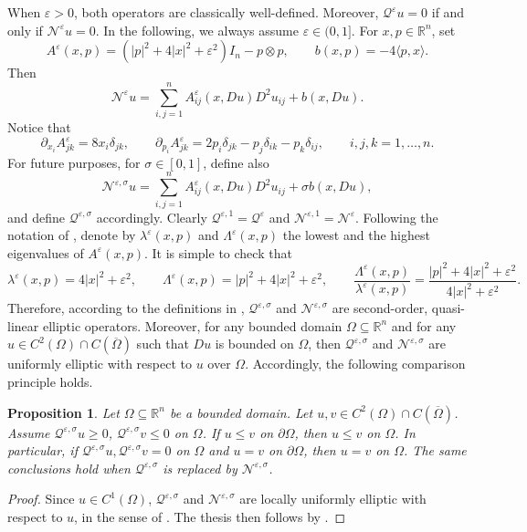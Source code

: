\documentclass[11pt]{amsart}
\renewcommand{\leq}{\leqslant}
\renewcommand{\geq}{\geqslant}
\renewcommand{\ge}{>}
\newcommand{\rr}{{\mathbb{R}}}
\newcommand{\Om}{\Omega}
\newcommand{\eps}{\varepsilon}
\newcommand{\Qe}{\mathcal Q^\eps}
\newcommand{\Ne}{\mathcal N^\eps}
\newcommand{\Nes}{\mathcal N^{\eps,\sigma}}
\newcommand{\Qes}{\mathcal Q^{\eps,\sigma}}
\newcommand{\Ae}{A^\eps}
\newtheorem{proposition}[theorem]{Proposition}
\theoremstyle{definition}
\theoremstyle{remark}
\numberwithin{equation}{section}
\begin{document}
When $\eps\ge 0$, both operators are classically well-defined. Moreover, $\Qe u=0$ if and only if $\Ne u=0$. In the following, we always assume $\eps\in(0,1]$. For $x,p\in\rr^n$, set 
\begin{equation}\label{definizione_matrici_eqregeps}
    \Ae(x,p)=(|p|^2+4|x|^2+\eps^2)I_n-p\otimes p,\qquad b(x,p)=-4\langle p,x\rangle.
\end{equation}
Then 
\begin{equation*}
    \Ne u=\sum_{i,j=1}^n\Ae_{ij}(x,Du)D^2 u_{ij}+b(x,Du).
    \end{equation*}
    Notice that 
    \begin{equation}\label{derivatematriceae384869}
        \partial _{x_i}\Ae_{jk}=8x_i\delta_{jk},\qquad  \partial _{p_i}\Ae_{jk}=2p_i\delta_{jk}-p_j\delta_{ik}-p_k\delta_{ij},\qquad i,j,k=1,\ldots,n.
    \end{equation}
    For future purposes, for $\sigma\in[0,1]$, define also 
  \begin{equation*}
    \Nes u=\sum_{i,j=1}^n\Ae_{ij}(x,Du)D^2 u_{ij}+\sigma b(x,Du),
    \end{equation*}
    and define $\Qes$ accordingly. Clearly $\mathcal Q^{\eps,1}=\Qe$ and $\mathcal N^{\eps,1}=\Ne$.
Following the notation of \cite{MR1814364}, denote by $\lambda^\eps(x,p)$ and $\Lambda^\eps(x,p)$ the lowest and the highest eigenvalues of $\Ae(x,p)$. It is simple to check that 
\begin{equation}\label{eigenvaluesofaeps}
    \lambda^\eps(x,p)=4|x|^2+\eps^2,\qquad \Lambda^\eps(x,p)=|p|^2+4|x|^2+\eps^2,\qquad\frac{\Lambda^\eps(x,p)}{\lambda^\eps(x,p)}=\frac{|p|^2+4|x|^2+\eps^2}{4|x|^2+\eps^2}.
\end{equation}
Therefore, according to the definitions in \cite[Chapter 10]{MR1814364}, $\Qes$ and $\Nes$ are second-order, quasi-linear elliptic operators. Moreover, for any bounded domain $\Om\subseteq\rr^n$ and for any $u\in C^2(\Om)\cap C(\overline\Om)$ such that $Du$ is bounded on $\Om$, then $\Qes$ and $\Nes$ are uniformly elliptic with respect to $u$ over $\Om$. Accordingly, the following comparison principle holds. 
\begin{proposition}\label{prop_comparison_principle}
   Let $\Om\subseteq\rr^n$ be a bounded domain. Let $u,v\in C^2(\Om)\cap C(\overline\Om)$. Assume $\Qes u\geq0$, $\Qes v\leq 0$ on $\Om$. If $u\leq v$ on $\partial\Om$, then $u\leq v$ on $\Om$. In particular, if $\Qes u,\Qes v=0$ on $\Om$ and $u=v$ on $\partial\Om$, then $u= v$ on $\Om$. The same conclusions hold when $\Qes$ is replaced by $\Nes$.
\end{proposition}
\begin{proof}
    Since $u\in C^1(\Om)$, $\Qes$ and $\Nes$ are locally uniformly elliptic with respect to $u$, in the sense of \cite[Chapter 10]{MR1814364}. The thesis then follows by \cite[Theorem 10.1]{MR1814364}.
\end{proof}
\end{document}
